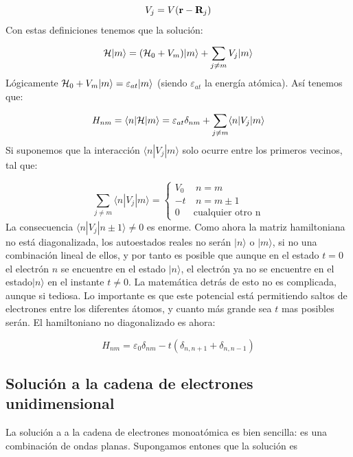 \begin{equation}
	V_j = V(\mathbf{r}-\mathbf{R}_j)
\end{equation}
Con estas definiciones tenemos que la solución:

\begin{equation}
	\mathcal{H} |m\rangle = (\mathcal{H}_0 + V_m) |m\rangle + \sum_{j\neq m} V_j |m\rangle
\end{equation}
Lógicamente $\mathcal{H}_0 +V_m |m\rangle = \varepsilon_{at}|m\rangle$ (siendo $\varepsilon_{at}$ la energía atómica). Así tenemos que:

\begin{equation}
	H_{nm} = \langle n | \mathcal{H} | m \rangle = \varepsilon_{at} \delta_{nm}+\sum_{j\neq m} \langle n |V_j |m\rangle
\end{equation}
Si suponemos que la interacción $\langle n | V_j | m \rangle$ solo ocurre entre los primeros vecinos, tal que:

\begin{equation}
	\sum_{j\neq m} \langle n |V_j |m\rangle = \left\lbrace \begin{array}{lc}
		V_0 & \ n=m \\
		-t & \ n=m\pm 1 \\
		 0 & \text{cualquier otro n}
	\end{array} \right.
\end{equation}
La consecuencia $\langle n|V_j|n\pm1\rangle \neq 0$ es enorme. Como ahora la matriz hamiltoniana no está diagonalizada, los autoestados reales no serán $|n\rangle$ o $|m\rangle$, si no una combinación lineal de ellos, y por tanto es posible que aunque en el estado $t=0$ el electrón $n$ se encuentre en el estado $|n\rangle$, el electrón ya no se encuentre en el estado$|n\rangle$ en el instante $t\neq 0$. La matemática detrás de esto no es complicada, aunque si tediosa. Lo importante es que este potencial está permitiendo saltos de electrones entre los diferentes átomos, y cuanto más grande sea $t$ mas posibles serán. El hamiltoniano no diagonalizado es ahora:

\begin{equation}
	H_{nm} = \varepsilon_0 \delta_{nm} - t(\delta_{n,n+1}+\delta_{n,n-1})
\end{equation}

\subsection{Solución a la cadena de electrones unidimensional}

La solución a a la cadena de electrones monoatómica es bien sencilla: es una combinación de ondas planas. Supongamos entones que la solución es

